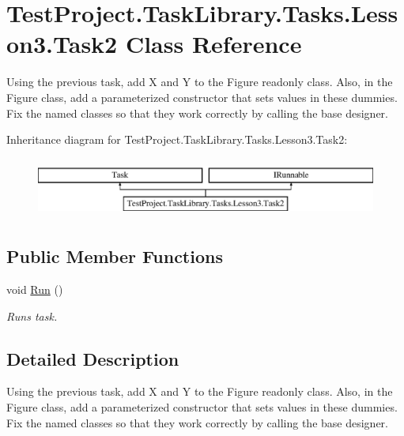 \hypertarget{class_test_project_1_1_task_library_1_1_tasks_1_1_lesson3_1_1_task2}{}\section{Test\+Project.\+Task\+Library.\+Tasks.\+Lesson3.\+Task2 Class Reference}
\label{class_test_project_1_1_task_library_1_1_tasks_1_1_lesson3_1_1_task2}


Using the previous task, add X and Y to the Figure readonly class. Also, in the Figure class, add a parameterized constructor that sets values in these dummies. Fix the named classes so that they work correctly by calling the base designer.  


Inheritance diagram for Test\+Project.\+Task\+Library.\+Tasks.\+Lesson3.\+Task2\+:\begin{figure}[H]
\begin{center}
\leavevmode
\includegraphics[height=2.000000cm]{class_test_project_1_1_task_library_1_1_tasks_1_1_lesson3_1_1_task2}
\end{center}
\end{figure}
\subsection*{Public Member Functions}
\begin{DoxyCompactItemize}
\item 
void \mbox{\hyperlink{class_test_project_1_1_task_library_1_1_tasks_1_1_lesson3_1_1_task2_a04a75929c91222c8c9a1142b0c9e5b3f}{Run}} ()
\begin{DoxyCompactList}\small\item\em Runs task. \end{DoxyCompactList}\end{DoxyCompactItemize}


\subsection{Detailed Description}
Using the previous task, add X and Y to the Figure readonly class. Also, in the Figure class, add a parameterized constructor that sets values in these dummies. Fix the named classes so that they work correctly by calling the base designer. 



